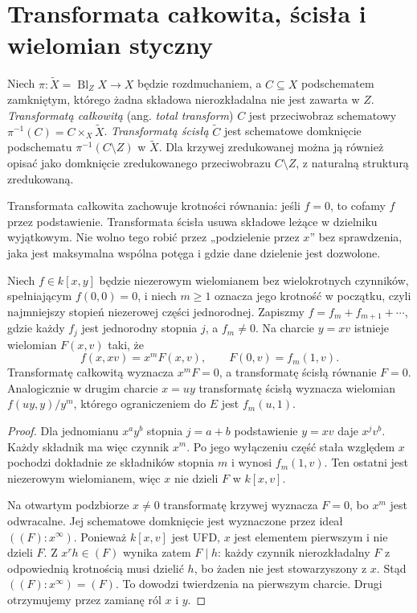 \section{Transformata całkowita, ścisła i wielomian styczny}
\label{sec:ga5-transform}

\begin{definicja}
\label{def:ga5-transform}
Niech $\pi:\widetilde X=\operatorname{Bl}_Z X\to X$
będzie rozdmuchaniem, a $C\subseteq X$ podschematem
zamkniętym, którego żadna składowa nierozkładalna
nie jest zawarta w $Z$. \emph{Transformatą całkowitą}
(ang. \emph{total transform}) $C$ jest przeciwobraz
schematowy $\pi^{-1}(C)=C\times_X\widetilde X$.
\emph{Transformatą ścisłą} $\widetilde C$ jest
schematowe domknięcie podschematu
$\pi^{-1}(C\setminus Z)$ w $\widetilde X$.
Dla krzywej zredukowanej można ją również opisać
jako domknięcie zredukowanego przeciwobrazu
$C\setminus Z$, z naturalną strukturą zredukowaną.
\end{definicja}

\begin{uwaga}
Transformata całkowita zachowuje krotności równania:
jeśli $f=0$, to cofamy $f$ przez podstawienie.
Transformata ścisła usuwa składowe leżące w dzielniku
wyjątkowym. Nie wolno tego robić przez
„podzielenie przez $x$” bez sprawdzenia, jaka jest
maksymalna wspólna potęga i gdzie dane dzielenie
jest dozwolone.
\end{uwaga}

\begin{twierdzenie}
\label{tw:ga5-strict-formula}
Niech $f\in k[x,y]$ będzie niezerowym wielomianem bez
wielokrotnych czynników, spełniającym $f(0,0)=0$,
i niech $m\ge1$ oznacza jego
krotność w początku, czyli najmniejszy stopień
niezerowej części jednorodnej. Zapiszmy
$f=f_m+f_{m+1}+\cdots$, gdzie każdy $f_j$
jest jednorodny stopnia $j$, a $f_m\ne0$.
Na charcie $y=xv$ istnieje wielomian $F(x,v)$ taki, że
\[
 f(x,xv)=x^mF(x,v),\qquad F(0,v)=f_m(1,v).
\]
Transformatę całkowitą wyznacza $x^mF=0$, a transformatę
ścisłą równanie $F=0$. Analogicznie w drugim charcie
$x=uy$ transformatę ścisłą wyznacza wielomian
$f(uy,y)/y^m$, którego ograniczeniem do $E$ jest
$f_m(u,1)$.
\end{twierdzenie}
\begin{proof}
Dla jednomianu $x^ay^b$ stopnia $j=a+b$ podstawienie
$y=xv$ daje $x^jv^b$. Każdy składnik ma więc czynnik
$x^m$. Po jego wyłączeniu część stała względem $x$
pochodzi dokładnie ze składników stopnia $m$ i wynosi
$f_m(1,v)$. Ten ostatni jest niezerowym wielomianem,
więc $x$ nie dzieli $F$ w $k[x,v]$.

Na otwartym podzbiorze $x\ne0$ transformatę krzywej
wyznacza $F=0$, bo $x^m$ jest odwracalne.
Jej schematowe domknięcie jest wyznaczone przez ideał
$((F):x^\infty)$. Ponieważ $k[x,v]$ jest UFD,
$x$ jest elementem pierwszym i nie dzieli $F$.
Z $x^r h\in(F)$ wynika zatem $F\mid h$:
każdy czynnik nierozkładalny $F$ z odpowiednią
krotnością musi dzielić $h$, bo żaden nie jest
stowarzyszony z $x$. Stąd $((F):x^\infty)=(F)$.
To dowodzi twierdzenia na pierwszym charcie.
Drugi otrzymujemy przez zamianę ról $x$ i $y$.
\end{proof}

